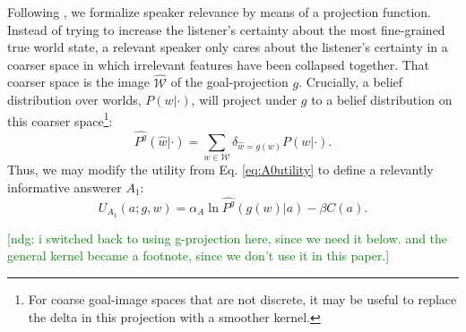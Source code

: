 \documentclass[11pt, floatsintext]{apa6}
\newcommand{\E}[2]{\ensuremath{\mathbb{E}_{#1}\left [#2 \right]}}
\newcommand{\ndg}[1]{\textcolor{Green}{[ndg: #1]}}
\begin{document}
Following , we formalize speaker relevance by means of a projection function. Instead of trying to increase the listener's certainty about the most fine-grained true world state, a relevant speaker only cares about the listener's certainty in a coarser space in which irrelevant features have been collapsed together. That coarser space is the image $\widehat{\mathcal{W}}$ of the goal-projection $g$. Crucially, a belief distribution over worlds, $P(w|\cdot)$, will project under $g$ to a belief distribution on this coarser space\footnote{For coarse goal-image spaces that are not discrete, it may be useful to replace the delta in this projection with a smoother kernel.}: 
$$\widehat{P^g}(\hat{w}|\cdot) = \sum_{w \in\mathcal{W}} \delta_{\hat{w} = g(w)} P(w|\cdot).$$
Thus, we may modify the utility from Eq. \ref{eq:A0utility} to define a relevantly informative answerer $A_1$: 
$$U_{A_1}(a; g, w) = \alpha_A \ln \widehat{P^g}(g(w)|a)  - \beta C(a).$$

\ndg{i switched back to using g-projection here, since we need it below. and the general kernel became a footnote, since we don't use it in this paper.}
\end{document}
